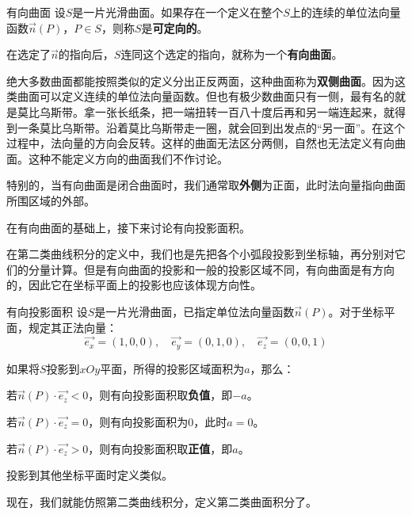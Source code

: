 \begin{definition}{有向曲面}{}
    设\(S\)是一片光滑曲面。如果存在一个定义在整个\(S\)上的连续的单位法向量函数\(\vec{n}(P)\)，\(P\in S\)，则称\(S\)是\textbf{可定向的}。

    在选定了\(\vec{n}\)的指向后，\(S\)连同这个选定的指向，就称为一个\textbf{有向曲面}。
\end{definition}

绝大多数曲面都能按照类似的定义分出正反两面，这种曲面称为\textbf{双侧曲面}。因为这类曲面可以定义连续的单位法向量函数。但也有极少数曲面只有一侧，最有名的就是莫比乌斯带。拿一张长纸条，把一端扭转一百八十度后再和另一端连起来，就得到一条莫比乌斯带。沿着莫比乌斯带走一圈，就会回到出发点的“另一面”。在这个过程中，法向量的方向会反转。这样的曲面无法区分两侧，自然也无法定义有向曲面。这种不能定义方向的曲面我们不作讨论。

特别的，当有向曲面是闭合曲面时，我们通常取\textbf{外侧}为正面，此时法向量指向曲面所围区域的外部。

在有向曲面的基础上，接下来讨论有向投影面积。

在第二类曲线积分的定义中，我们也是先把各个小弧段投影到坐标轴，再分别对它们的分量计算。但是有向曲面的投影和一般的投影区域不同，有向曲面是有方向的，因此它在坐标平面上的投影也应该体现方向性。

\begin{definition}{有向投影面积}{}
    设\(S\)是一片光滑曲面，已指定单位法向量函数\(\vec{n}(P)\)。对于坐标平面，规定其正法向量：
    \[\vec{e_x}=(1,0,0),\quad \vec{e_y}=(0,1,0),\quad \vec{e_z}=(0,0,1)\]

    如果将\(S\)投影到\(xOy\)平面，所得的投影区域面积为$a$，那么：

    若\(\vec{n}(P)\cdot \vec{e_z}<0\)，则有向投影面积取\textbf{负值}，即$-a$。

    若\(\vec{n}(P)\cdot \vec{e_z}=0\)，则有向投影面积为\textbf{$0$}，此时$a=0$。

    若\(\vec{n}(P)\cdot \vec{e_z}>0\)，则有向投影面积取\textbf{正值}，即$a$。

    投影到其他坐标平面时定义类似。
\end{definition}

现在，我们就能仿照第二类曲线积分，定义第二类曲面积分了。

